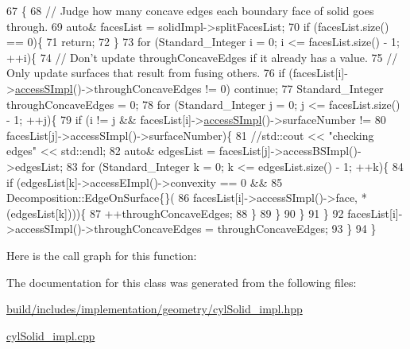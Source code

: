 \begin{DoxyCode}
67                                                                        \{
68     \textcolor{comment}{// Judge how many concave edges each boundary face of solid goes through.}
69     \textcolor{keyword}{auto}& facesList = solidImpl->splitFacesList;
70     \textcolor{keywordflow}{if} (facesList.size() == 0)\{
71         \textcolor{keywordflow}{return};
72     \}
73     \textcolor{keywordflow}{for} (Standard\_Integer i = 0; i <= facesList.size() - 1; ++i)\{
74         \textcolor{comment}{// Don't update throughConcaveEdges if it already has a value.}
75         \textcolor{comment}{// Only update surfaces that result from fusing others.}
76         \textcolor{keywordflow}{if} (facesList[i]->\hyperlink{classMcCAD_1_1Geometry_1_1Solid_a41304db7cdf4762342ea833b15764180}{accessSImpl}()->throughConcaveEdges != 0) \textcolor{keywordflow}{continue};
77         Standard\_Integer throughConcaveEdges = 0;
78         \textcolor{keywordflow}{for} (Standard\_Integer j = 0; j <= facesList.size() - 1; ++j)\{
79             \textcolor{keywordflow}{if} (i != j && facesList[i]->\hyperlink{classMcCAD_1_1Geometry_1_1Solid_a41304db7cdf4762342ea833b15764180}{accessSImpl}()->surfaceNumber !=
80                     facesList[j]->accessSImpl()->surfaceNumber)\{
81                 \textcolor{comment}{//std::cout << "checking edges" << std::endl;}
82                 \textcolor{keyword}{auto}& edgesList = facesList[j]->accessBSImpl()->edgesList;
83                 \textcolor{keywordflow}{for} (Standard\_Integer k = 0; k <= edgesList.size() - 1; ++k)\{
84                     \textcolor{keywordflow}{if} (edgesList[k]->accessEImpl()->convexity == 0 &&
85                             Decomposition::EdgeOnSurface\{\}(
86                                 facesList[i]->accessSImpl()->face, *(edgesList[k])))\{
87                         ++throughConcaveEdges;
88                     \}
89                 \}
90             \}
91         \}
92         facesList[i]->accessSImpl()->throughConcaveEdges = throughConcaveEdges;
93     \}
94 \}
\end{DoxyCode}
Here is the call graph for this function\+:


The documentation for this class was generated from the following files\+:\begin{DoxyCompactItemize}
\item 
\hyperlink{build_2includes_2implementation_2geometry_2cylSolid__impl_8hpp}{build/includes/implementation/geometry/cyl\+Solid\+\_\+impl.\+hpp}\item 
\hyperlink{cylSolid__impl_8cpp}{cyl\+Solid\+\_\+impl.\+cpp}\end{DoxyCompactItemize}
